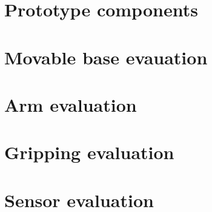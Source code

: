 \section*{Prototype components}
\section*{Movable base evauation}
\section*{Arm evaluation}
\section*{Gripping evaluation}
\section*{Sensor evaluation}